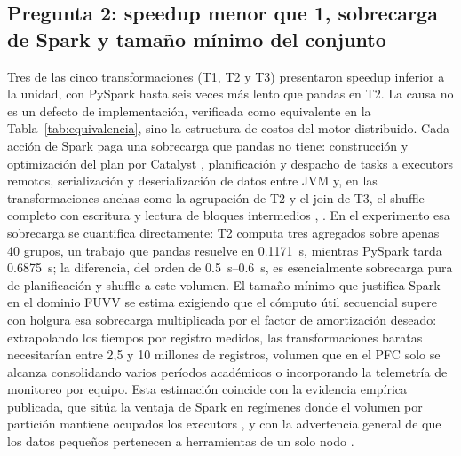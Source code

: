 \documentclass[10pt,journal]{IEEEtran}
\begin{document}
\subsection{Pregunta 2: speedup menor que 1, sobrecarga de Spark y tama\~no m\'inimo del conjunto}
Tres de las cinco transformaciones (T1, T2 y T3) presentaron speedup inferior a
la unidad, con PySpark hasta seis veces m\'as lento que pandas en T2. La causa
no es un defecto de implementaci\'on, verificada como equivalente en la
Tabla~\ref{tab:equivalencia}, sino la estructura de costos del motor
distribuido. Cada acci\'on de Spark paga una sobrecarga que pandas no tiene:
construcci\'on y optimizaci\'on del plan por Catalyst \cite{armbrust2015},
planificaci\'on y despacho de tasks a executors remotos, serializaci\'on y
deserializaci\'on de datos entre JVM y, en las transformaciones anchas como la
agrupaci\'on de T2 y el join de T3, el shuffle completo con escritura y lectura
de bloques intermedios \cite{armbrust2015}, \cite{zaharia2016}. En el
experimento esa sobrecarga se cuantifica directamente: T2 computa tres
agregados sobre apenas 40 grupos, un trabajo que pandas resuelve en
\SI{0.1171}{\second}, mientras PySpark tarda \SI{0.6875}{\second}; la
diferencia, del orden de \SI{0.5}{\second}--\SI{0.6}{\second}, es
esencialmente sobrecarga pura de planificaci\'on y shuffle a este volumen. El
tama\~no m\'inimo que justifica Spark en el dominio FUVV se estima exigiendo
que el c\'omputo \'util secuencial supere con holgura esa sobrecarga
multiplicada por el factor de amortizaci\'on deseado: extrapolando los tiempos
por registro medidos, las transformaciones baratas necesitar\'ian entre 2,5 y
10 millones de registros, volumen que en el PFC solo se alcanza consolidando
varios per\'iodos acad\'emicos o incorporando la telemetr\'ia de monitoreo por
equipo. Esta estimaci\'on coincide con la evidencia emp\'irica publicada, que
sit\'ua la ventaja de Spark en reg\'imenes donde el volumen por partici\'on
mantiene ocupados los executors \cite{ahmed2020}, y con la advertencia general
de que los datos peque\~nos pertenecen a herramientas de un solo nodo
\cite{armbrust2015}.
\end{document}
